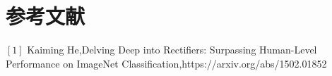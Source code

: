 \section{参考文献}
$[1]$ Kaiming He,Delving Deep into Rectifiers: Surpassing Human-Level Performance on ImageNet Classification,https://arxiv.org/abs/1502.01852